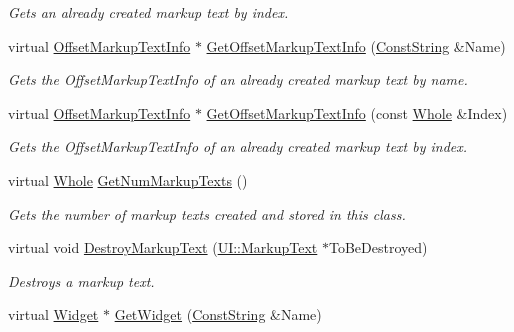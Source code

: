 \begin{DoxyCompactItemize}
\begin{DoxyCompactList}\small\item\em Gets an already created markup text by index. \item\end{DoxyCompactList}\item 
virtual \hyperlink{structphys_1_1UI_1_1ResizingInfo}{OffsetMarkupTextInfo} $\ast$ \hyperlink{classphys_1_1UI_1_1Window_a9906bb131f631af0a9aed7dbb7744112}{GetOffsetMarkupTextInfo} (\hyperlink{namespacephys_a5ce5049f8b4bf88d6413c47b504ebb31}{ConstString} \&Name)
\begin{DoxyCompactList}\small\item\em Gets the OffsetMarkupTextInfo of an already created markup text by name. \item\end{DoxyCompactList}\item 
virtual \hyperlink{structphys_1_1UI_1_1ResizingInfo}{OffsetMarkupTextInfo} $\ast$ \hyperlink{classphys_1_1UI_1_1Window_aa809c88016b239c81b53e060b547ec85}{GetOffsetMarkupTextInfo} (const \hyperlink{namespacephys_a460f6bc24c8dd347b05e0366ae34f34a}{Whole} \&Index)
\begin{DoxyCompactList}\small\item\em Gets the OffsetMarkupTextInfo of an already created markup text by index. \item\end{DoxyCompactList}\item 
virtual \hyperlink{namespacephys_a460f6bc24c8dd347b05e0366ae34f34a}{Whole} \hyperlink{classphys_1_1UI_1_1Window_ac9e23e41ffff8ef475fcdb0c25bad240}{GetNumMarkupTexts} ()
\begin{DoxyCompactList}\small\item\em Gets the number of markup texts created and stored in this class. \item\end{DoxyCompactList}\item 
virtual void \hyperlink{classphys_1_1UI_1_1Window_aba2506738c7cccfbf8297bf03e431cb8}{DestroyMarkupText} (\hyperlink{classphys_1_1UI_1_1MarkupText}{UI::MarkupText} $\ast$ToBeDestroyed)
\begin{DoxyCompactList}\small\item\em Destroys a markup text. \item\end{DoxyCompactList}\item 
virtual \hyperlink{classphys_1_1UI_1_1Widget}{Widget} $\ast$ \hyperlink{classphys_1_1UI_1_1Window_a0d2274afdabda9915d242dc3d057ae61}{GetWidget} (\hyperlink{namespacephys_a5ce5049f8b4bf88d6413c47b504ebb31}{ConstString} \&Name)

\end{DoxyCompactItemize}
